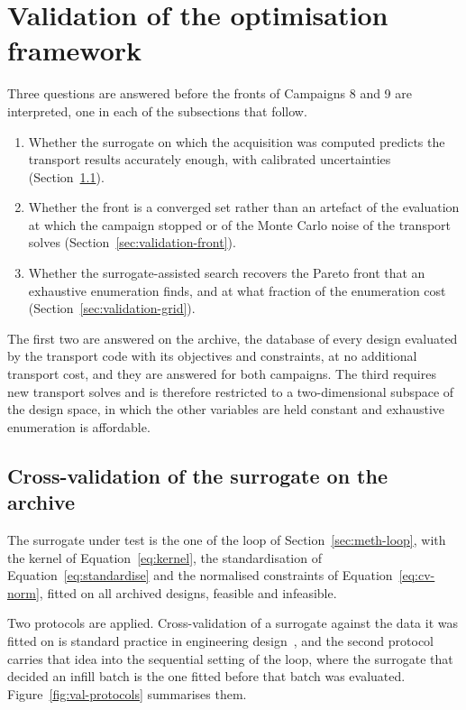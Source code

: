 \section{Validation of the optimisation framework}
\label{sec:validation-framework}

Three questions are answered before the fronts of Campaigns 8 and 9 are
interpreted, one in each of the subsections that follow.

\begin{enumerate}
  \item Whether the surrogate on which the acquisition was computed
        predicts the transport results accurately enough, with
        calibrated uncertainties
        (Section~\ref{sec:validation-surrogate}).

  \item Whether the front is a converged set rather than an artefact of
        the evaluation at which the campaign stopped or of the Monte
        Carlo noise of the transport solves
        (Section~\ref{sec:validation-front}).

  \item Whether the surrogate-assisted search recovers the Pareto front
        that an exhaustive enumeration finds, and at what fraction of
        the enumeration cost (Section~\ref{sec:validation-grid}).
\end{enumerate}

The first two are answered on the archive, the database of every design
evaluated by the transport code with its objectives and constraints, at
no additional transport cost, and they are answered for both campaigns.
The third requires new transport solves and is therefore restricted to
a two-dimensional subspace of the design space, in which the other
variables are held constant and exhaustive enumeration is affordable.

\subsection{Cross-validation of the surrogate on the archive}
\label{sec:validation-surrogate}

The surrogate under test is the one of the loop of
Section~\ref{sec:meth-loop}, with the kernel of
Equation~\eqref{eq:kernel}, the standardisation of
Equation~\eqref{eq:standardise} and the normalised constraints of
Equation~\eqref{eq:cv-norm}, fitted on all archived designs, feasible
and infeasible.

Two protocols are applied. Cross-validation of a surrogate against the
data it was fitted on is standard practice in engineering
design~\cite{forrester_book_2008}, and the second protocol carries that
idea into the sequential setting of the loop, where the surrogate that
decided an infill batch is the one fitted before that batch was
evaluated. Figure~\ref{fig:val-protocols} summarises them.

